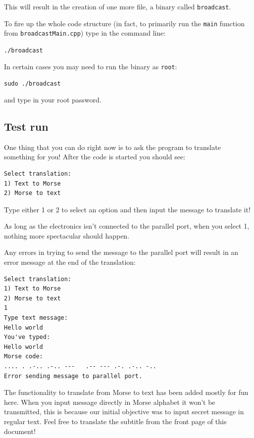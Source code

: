 \documentclass[12pt]{report}
\begin{document}
This will result in the creation of one more file, a binary called \verb|broadcast|.

To fire up the whole code structure (in fact, to primarily run the \verb|main| function from \verb|broadcastMain.cpp|) type in the command line:

\begin{snugshade}
\verb|./broadcast|
\end{snugshade}


In certain cases you may need to run the binary as \verb|root|:

\begin{snugshade}
\verb|sudo ./broadcast|
\end{snugshade}

and type in your root password.

\subsection{Test run}

One thing that you can do right now is to ask the program to translate something for you! After the code is started you should see:

\begin{snugshade}
\begin{verbatim}
Select translation:
1) Text to Morse
2) Morse to text
\end{verbatim}
\end{snugshade}

Type either 1 or 2 to select an option and then input the message to translate it!

As long as the electronics isn't connected to the parallel port, when you select 1, nothing more spectacular should happen.

Any errors in trying to send the message to the parallel port will result in an error message at the end of the translation:

\begin{snugshade}
\begin{verbatim}
Select translation:
1) Text to Morse
2) Morse to text
1
Type text message:
Hello world
You've typed: 
Hello world
Morse code: 
.... . .-.. .-.. ---   .-- --- .-. .-.. -.. 
Error sending message to parallel port.
\end{verbatim}
\end{snugshade}

The functionality to translate from Morse to text has been added mostly for fun here. When you input message directly in Morse alphabet it won't be transmitted, this is because our initial objective was to input secret message in regular text. Feel free to translate the subtitle from the front page of this document!
\end{document}
